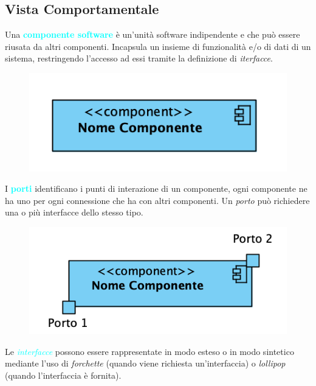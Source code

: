 \subsection{Vista Comportamentale}

\begin{definition}[Componente]
    Una \textbf{\textcolor{cyan}{componente software}} è un'unità software indipendente
    e che può essere riusata da altri componenti. Incapsula un insieme di funzionalità e/o di
    dati di un sistema, restringendo l'accesso ad essi tramite la definizione di \emph{iterfacce}.
\end{definition}

\begin{figure}[H]
    \centering
    \includegraphics[scale=0.8]{img/component.png}
\end{figure}

\begin{definition}[Porti]
    I \textbf{\textcolor{cyan}{porti}} identificano i punti di interazione di un componente, ogni componente ne ha uno
    per ogni connessione che ha con altri componenti. Un \emph{porto} può richiedere una o più interfacce dello stesso tipo.
\end{definition}

\begin{figure}[H]
    \centering
    \includegraphics[scale=0.8]{img/porti.png}
\end{figure}

Le \emph{\textcolor{cyan}{interfacce}} possono essere rappresentate in modo esteso o in modo sintetico mediante l'uso
di \emph{forchette} (quando viene richiesta un'interfaccia) o \emph{lollipop} (quando l'interfaccia è fornita).

